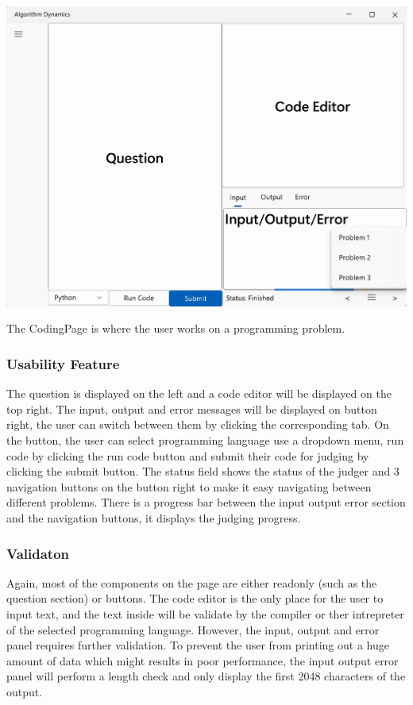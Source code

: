 \documentclass[a4paper]{report}
\begin{document}
\includegraphics[width=\textwidth, height=\textheight, keepaspectratio]{CodingPage-design}

The CodingPage is where the user works on a programming problem.

\subsubsection{Usability Feature}

The question is displayed on the left and a code editor will be displayed on the top right. The input, output and error messages will be displayed on button right, the user can switch between them by clicking the corresponding tab. On the button, the user can select programming language use a dropdown menu, run code by clicking the run code button and submit their code for judging by clicking the submit button. The status field shows the status of the judger and 3 navigation buttons on the button right to make it easy navigating between different problems. There is a progress bar between the input output error section and the navigation buttons, it displays the judging progress.  

\subsubsection{Validaton}

Again, most of the components on the page are either readonly (such as the question section) or buttons. The code editor is the only place for the user to input text, and the text inside will be validate by the compiler or ther intrepreter of the selected programming language. However, the input, output and error panel requires further validation. To prevent the user from printing out a huge amount of data which might results in poor performance, the input output error panel will perform a length check and only display the first 2048 characters of the output. 
\end{document}
